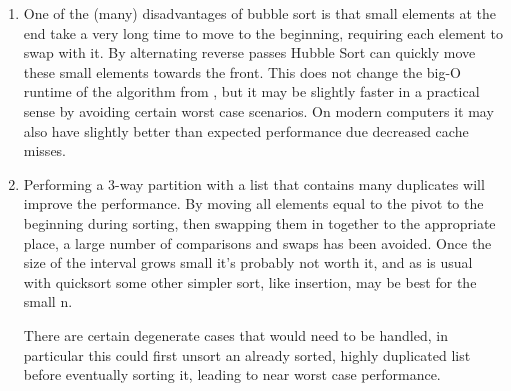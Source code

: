 \documentclass[12pt]{chmullighw}
\begin{document}
\begin{enumerate}
\begin{enumerate}


\end{enumerate}


\item One of the (many) disadvantages of bubble sort is that small elements at the end take a very long time to move to the beginning, requiring each element to swap with it. By alternating reverse passes Hubble Sort can quickly move these small elements towards the front. This does not change the big-O runtime of the algorithm from , but it may be slightly faster in a practical sense by avoiding certain worst case scenarios. On modern computers it may also have slightly  better than expected performance due decreased cache misses.


\item Performing a 3-way partition with a list that contains many duplicates will improve the performance. By moving all elements equal to the pivot to the beginning during sorting, then swapping them in together to the appropriate place, a large number of comparisons and swaps has been avoided. Once the size of the interval grows small it's probably not worth it, and as is usual with quicksort some other simpler sort, like insertion, may be best for the small n.

There are certain degenerate cases that would need to be handled, in particular this could first unsort an already sorted, highly duplicated list before eventually sorting it, leading to near worst case performance.



\end{enumerate}
\end{document}
